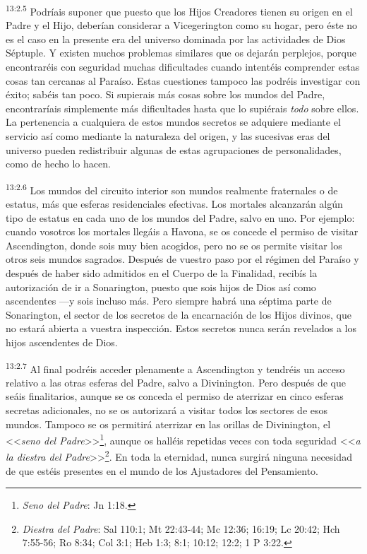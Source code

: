 \par
\textsuperscript{13:2.5} Podríais suponer que puesto que los Hijos Creadores tienen su origen en el Padre y el Hijo, deberían considerar a Vicegerington como su hogar, pero éste no es el caso en la presente era del universo dominada por las actividades de Dios Séptuple. Y existen muchos problemas similares que os dejarán perplejos, porque encontraréis con seguridad muchas dificultades cuando intentéis comprender estas cosas tan cercanas al Paraíso. Estas cuestiones tampoco las podréis investigar con éxito; sabéis tan poco. Si supierais más cosas sobre los mundos del Padre, encontraríais simplemente más dificultades hasta que lo supiérais \textit{todo} sobre ellos. La pertenencia a cualquiera de estos mundos secretos se adquiere mediante el servicio así como mediante la naturaleza del origen, y las sucesivas eras del universo pueden redistribuir algunas de estas agrupaciones de personalidades, como de hecho lo hacen.

\par
\textsuperscript{13:2.6} Los mundos del circuito interior son mundos realmente fraternales o de estatus, más que esferas residenciales efectivas. Los mortales alcanzarán algún tipo de estatus en cada uno de los mundos del Padre, salvo en uno. Por ejemplo: cuando vosotros los mortales llegáis a Havona, se os concede el permiso de visitar Ascendington, donde sois muy bien acogidos, pero no se os permite visitar los otros seis mundos sagrados. Después de vuestro paso por el régimen del Paraíso y después de haber sido admitidos en el Cuerpo de la Finalidad, recibís la autorización de ir a Sonarington, puesto que sois hijos de Dios así como ascendentes ---y sois incluso más. Pero siempre habrá una séptima parte de Sonarington, el sector de los secretos de la encarnación de los Hijos divinos, que no estará abierta a vuestra inspección. Estos secretos nunca serán revelados a los hijos ascendentes de Dios.

\par
\textsuperscript{13:2.7} Al final podréis acceder plenamente a Ascendington y tendréis un acceso relativo a las otras esferas del Padre, salvo a Divinington. Pero después de que seáis finalitarios, aunque se os conceda el permiso de aterrizar en cinco esferas secretas adicionales, no se os autorizará a visitar todos los sectores de esos mundos. Tampoco se os permitirá aterrizar en las orillas de Divinington, el <<\textit{seno del Padre}>>\footnote{\textit{Seno del Padre}: Jn 1:18.}, aunque os halléis repetidas veces con toda seguridad <<\textit{a la diestra del Padre}>>\footnote{\textit{Diestra del Padre}: Sal 110:1; Mt 22:43-44; Mc 12:36; 16:19; Lc 20:42; Hch 7:55-56; Ro 8:34; Col 3:1; Heb 1:3; 8:1; 10:12; 12:2; 1 P 3:22.}. En toda la eternidad, nunca surgirá ninguna necesidad de que estéis presentes en el mundo de los Ajustadores del Pensamiento.

